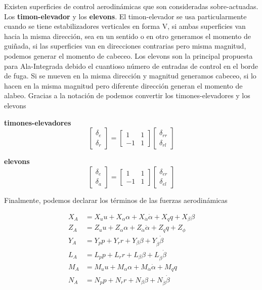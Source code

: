 Existen superficies de control aerodinámicas que son consideradas sobre-actuadas. Los \textbf{timon-elevador} y los \textbf{elevons}. 
El timon-elevador se usa particularmente cuando se tiene estabilizadores verticales en forma V, si ambas superficies van hacia la misma dirección, sea en un sentido o en otro generamos el momento de guiñada, si las superficies van en direcciones contrarias pero misma magnitud, podemos generar el momento de cabeceo. 
Los elevons son la principal propuesta para Ala-Integrada debido el cuantioso número de entradas de control en el borde de fuga. Si se mueven en la misma dirección y magnitud generamos cabeceo, si lo hacen en la misma magnitud pero diferente dirección generan el momento de alabeo. 
Gracias a la notación de \cite{Beard2012} podemos convertir los timones-elevadores y los elevons 

\textbf{timones-elevadores}
\begin{equation}
\begin{bmatrix}
\delta_{e} \\
\delta_{r}
\end{bmatrix}
=
\begin{bmatrix}
1 & 1 \\
-1 & 1 
\end{bmatrix}
\begin{bmatrix}
\delta_{rr} \\
\delta_{rl}
\end{bmatrix}
\end{equation}

\textbf{elevons}
\begin{equation}
\begin{bmatrix}
\delta_{e} \\
\delta_{a}
\end{bmatrix}
=
\begin{bmatrix}
1 & 1 \\
-1 & 1 
\end{bmatrix}
\begin{bmatrix}
\delta_{er} \\
\delta_{el}
\end{bmatrix}
\end{equation}


Finalmente, podemos declarar los términos de las fuerzas aerodinámicas

\begin{align}
    X_A &= X_{u}u + X_{\alpha}\alpha + X_{\dot \alpha}\dot \alpha + X_{q}q + X_{\beta} \beta \\
    Z_A &= Z_{u}u + Z_{\alpha}\alpha + Z_{\dot \alpha}\dot \alpha + Z_{q}q + Z_{\phi} \\
    Y_A &= Y_{p}p + Y_{r}r + Y_{\beta}\beta + Y_{\dot \beta}\dot \beta  \\
    L_A &= L_{p}p + L_{r}r + L_{\beta}\beta + L_{\dot \beta}\dot \beta \\
    M_A &= M_{u}u + M_{\alpha}\alpha + M_{\dot \alpha}\dot \alpha + M_{q}q  \\
    N_A &= N_{p}p + N_{r}r + N_{\beta}\beta + N_{\dot \beta}\dot \beta
\end{align}

